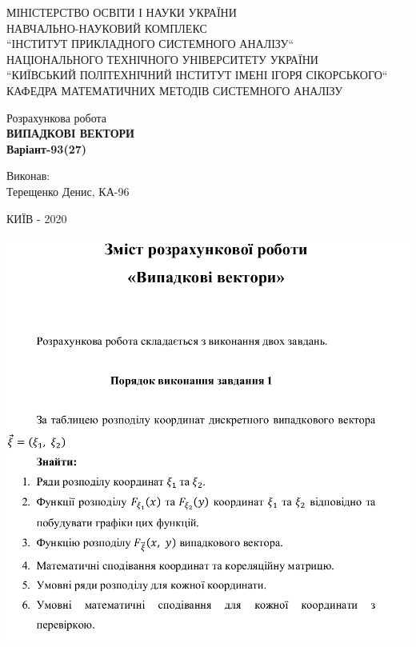 \documentclass[14pt,a4paper]{scrartcl}
\theoremstyle{definition}
\newtheorem*{defo}{Означення}
\theoremstyle{remark}
\theoremstyle{definition}
\theoremstyle{definition}
\begin{document}
\def\be{\begin{equation}}
\def\ee{\end{equation}}
\def\bd{\begin{defo}}
\def\ed{\end{defo}}
\def\bbt{\begin{boxteo}}
\def\ebt{\end{boxteo}}
\def\i{\infty}
\def\d{\partial}


\begin{titlepage}
\centering
	\vspace{1cm}
	{ МІНІСТЕРСТВО ОСВІТИ І НАУКИ УКРАЇНИ\\
  НАВЧАЛЬНО-НАУКОВИЙ КОМПЛЕКС\\
  ``ІНСТИТУТ ПРИКЛАДНОГО СИСТЕМНОГО АНАЛІЗУ``\\
  НАЦІОНАЛЬНОГО ТЕХНІЧНОГО УНІВЕРСИТЕТУ УКРАЇНИ\\
  ``КИЇВСЬКИЙ ПОЛІТЕХНІЧНИЙ ІНСТИТУТ ІМЕНІ ІГОРЯ СІКОРСЬКОГО``\\
  КАФЕДРА МАТЕМАТИЧНИХ МЕТОДІВ  СИСТЕМНОГО АНАЛІЗУ\\\par}
	\vspace{5cm}
	{\large Розрахункова робота \\
\textbf{ВИПАДКОВІ ВЕКТОРИ\\ Варіант-93(27)} \\ \par}
	\vfill
  \begin{flushright}
  Виконав:\\
   Терещенко Денис, КА-96\\

  \end{flushright}


	\vfill

	{\large КИЇВ - 2020 \par}
\end{titlepage}
\begin{center} \includegraphics[scale=0.5]{assets/1.png} \end{center}
\end{document}
